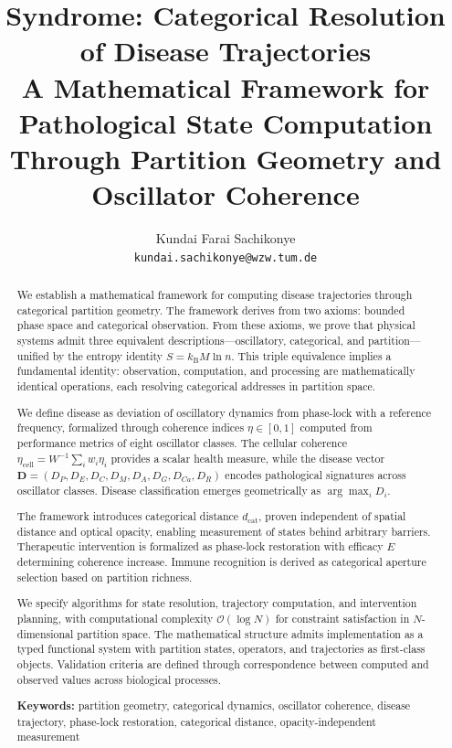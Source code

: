 \documentclass[10pt,twocolumn]{article}
\title{Syndrome: Categorical Resolution of Disease Trajectories\\[0.5em]
\large A Mathematical Framework for Pathological State Computation\\Through Partition Geometry and Oscillator Coherence}
\author{
Kundai Farai Sachikonye\\
\texttt{kundai.sachikonye@wzw.tum.de}
}
\date{}
\theoremstyle{plain}
\theoremstyle{definition}
\theoremstyle{remark}
\newcommand{\kB}{k_{\mathrm{B}}}
\newcommand{\dcat}{d_{\mathrm{cat}}}
\newcommand{\etacell}{\eta_{\mathrm{cell}}}
\newcommand{\Dvec}{\mathbf{D}}
\newcommand{\bigO}{\mathcal{O}}
\begin{document}
\maketitle

\begin{abstract}
We establish a mathematical framework for computing disease trajectories through categorical partition geometry. The framework derives from two axioms: bounded phase space and categorical observation. From these axioms, we prove that physical systems admit three equivalent descriptions---oscillatory, categorical, and partition---unified by the entropy identity $S = \kB M \ln n$. This triple equivalence implies a fundamental identity: observation, computation, and processing are mathematically identical operations, each resolving categorical addresses in partition space.

We define disease as deviation of oscillatory dynamics from phase-lock with a reference frequency, formalized through coherence indices $\eta \in [0,1]$ computed from performance metrics of eight oscillator classes. The cellular coherence $\etacell = W^{-1}\sum_i w_i \eta_i$ provides a scalar health measure, while the disease vector $\Dvec = (D_P, D_E, D_C, D_M, D_A, D_G, D_{Ca}, D_R)$ encodes pathological signatures across oscillator classes. Disease classification emerges geometrically as $\arg\max_i D_i$.

The framework introduces categorical distance $\dcat$, proven independent of spatial distance and optical opacity, enabling measurement of states behind arbitrary barriers. Therapeutic intervention is formalized as phase-lock restoration with efficacy $E$ determining coherence increase. Immune recognition is derived as categorical aperture selection based on partition richness.

We specify algorithms for state resolution, trajectory computation, and intervention planning, with computational complexity $\bigO(\log N)$ for constraint satisfaction in $N$-dimensional partition space. The mathematical structure admits implementation as a typed functional system with partition states, operators, and trajectories as first-class objects. Validation criteria are defined through correspondence between computed and observed values across biological processes.

\vspace{0.5em}
\noindent\textbf{Keywords:} partition geometry, categorical dynamics, oscillator coherence, disease trajectory, phase-lock restoration, categorical distance, opacity-independent measurement
\end{abstract}
\end{document}
